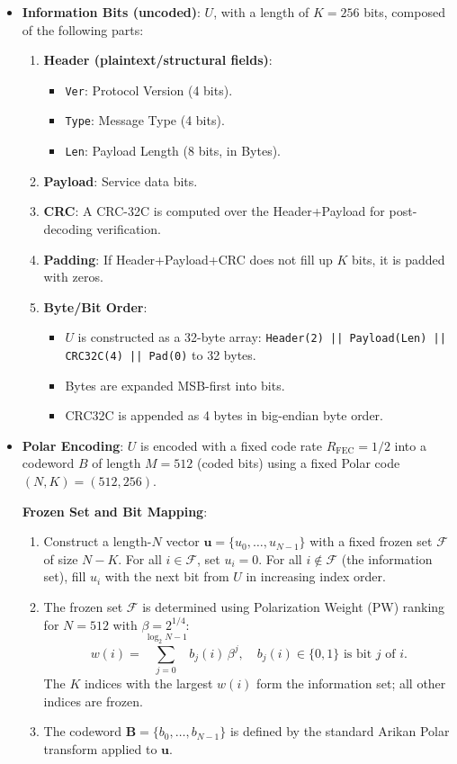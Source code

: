 \documentclass[11pt]{article}
\begin{document}
\begin{itemize}
\item \textbf{Information Bits (uncoded)}: $U$, with a length of $K=256$ bits, composed of the following parts:
  \begin{enumerate}
  \item \textbf{Header (plaintext/structural fields)}:
    \begin{itemize}
    \item \texttt{Ver}: Protocol Version (4 bits).
    \item \texttt{Type}: Message Type (4 bits).
    \item \texttt{Len}: Payload Length (8 bits, in Bytes).
    \end{itemize}
  \item \textbf{Payload}: Service data bits.
  \item \textbf{CRC}: A CRC-32C is computed over the Header+Payload for post-decoding verification.
  \item \textbf{Padding}: If Header+Payload+CRC does not fill up $K$ bits, it is padded with zeros.
  \item \textbf{Byte/Bit Order}:
    \begin{itemize}
    \item $U$ is constructed as a 32-byte array: \texttt{Header(2) || Payload(Len) || CRC32C(4) || Pad(0)} to 32 bytes.
    \item Bytes are expanded MSB-first into bits.
    \item CRC32C is appended as 4 bytes in big-endian byte order.
    \end{itemize}
  \end{enumerate}

\item \textbf{Polar Encoding}: $U$ is encoded with a fixed code rate $R_{\text{FEC}}=1/2$ into a codeword $B$ of length $M=512$ (coded bits) using a fixed Polar code $(N,K)=(512,256)$.

  \textbf{Frozen Set and Bit Mapping}:
  \begin{enumerate}
  \item Construct a length-$N$ vector $\mathbf{u}=\{u_0,\dots,u_{N-1}\}$ with a fixed frozen set $\mathcal{F}$ of size $N-K$. For all $i\in\mathcal{F}$, set $u_i=0$. For all $i\notin\mathcal{F}$ (the information set), fill $u_i$ with the next bit from $U$ in increasing index order.
  \item The frozen set $\mathcal{F}$ is determined using Polarization Weight (PW) ranking for $N=512$ with $\beta=2^{1/4}$:
    \[
      w(i) = \sum_{j=0}^{\log_2 N - 1} b_j(i)\,\beta^j,\quad b_j(i)\in\{0,1\} \text{ is bit } j \text{ of } i.
    \]
    The $K$ indices with the largest $w(i)$ form the information set; all other indices are frozen.
  \item The codeword $\mathbf{B}=\{b_0,\dots,b_{N-1}\}$ is defined by the standard Arikan Polar transform applied to $\mathbf{u}$.
  \end{enumerate}


\end{itemize}
\end{document}
